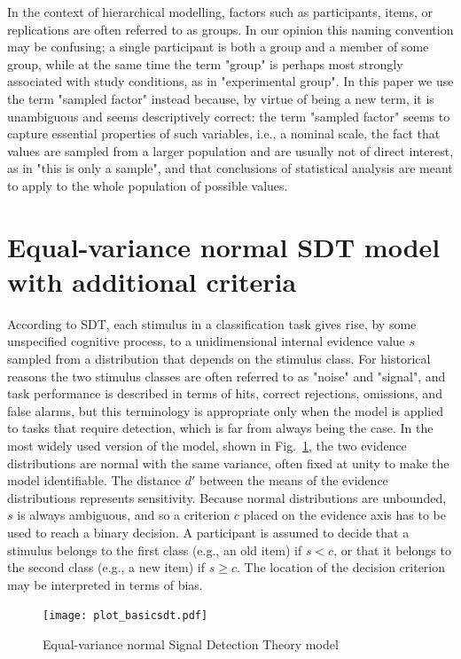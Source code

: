 \documentclass[a4paper,man,apacite,floatsintext]{apa6}
\begin{document}
In the context of hierarchical modelling, factors such as
participants, items, or replications are often referred to as
groups. In our opinion this naming convention may be confusing; a
single participant is both a group and a member of some group, while
at the same time the term "group" is perhaps most strongly associated
with study conditions, as in "experimental group". In this paper we
use the term "sampled factor" instead because, by virtue of being a
new term, it is unambiguous and seems descriptively correct: the term
"sampled factor" seems to capture essential properties of such
variables, i.e., a nominal scale, the fact that values are sampled
from a larger population and are usually not of direct interest, as in
"this is only a sample", and that conclusions of statistical analysis
are meant to apply to the whole population of possible values.

\section{Equal-variance normal SDT model with additional criteria}

According to SDT, each stimulus in a classification task gives rise,
by some unspecified cognitive process, to a unidimensional internal
evidence value $s$ sampled from a distribution that depends on the
stimulus class. For historical reasons the two stimulus classes are
often referred to as "noise" and "signal", and task performance is
described in terms of hits, correct rejections, omissions, and false
alarms, but this terminology is appropriate only when the model is
applied to tasks that require detection, which is far from always
being the case. In the most widely used version of the model, shown in
Fig.~\ref{basicsdt}, the two evidence distributions are normal with
the same variance, often fixed at unity to make the model
identifiable. The distance $d'$ between the means of the evidence
distributions represents sensitivity. Because normal distributions are
unbounded, $s$ is always ambiguous, and so a criterion $c$ placed on
the evidence axis has to be used to reach a binary decision. A
participant is assumed to decide that a stimulus belongs to the first
class (e.g., an old item) if $s < c$, or that it belongs to the second
class (e.g., a new item) if $s \geq c$. The location of the decision
criterion may be interpreted in terms of bias.

\begin{figure}[H]
  \centering
  \texttt{[image: plot\_basicsdt.pdf]}
  \caption{Equal-variance normal Signal Detection Theory model}
  \label{basicsdt}
\end{figure}
\end{document}
